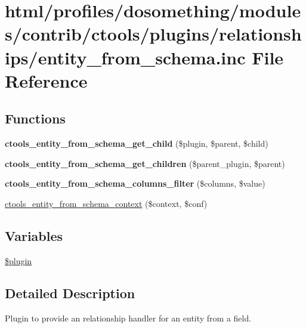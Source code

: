 \hypertarget{entity__from__schema_8inc}{
\section{html/profiles/dosomething/modules/contrib/ctools/plugins/relationships/entity\_\-from\_\-schema.inc File Reference}
\label{entity__from__schema_8inc}
}
\subsection*{Functions}
\begin{DoxyCompactItemize}
\item 
\hypertarget{entity__from__schema_8inc_ac19d1b35d03bdb7469c775bf7d32271b}{
{\bfseries ctools\_\-entity\_\-from\_\-schema\_\-get\_\-child} (\$plugin, \$parent, \$child)}
\label{entity__from__schema_8inc_ac19d1b35d03bdb7469c775bf7d32271b}

\item 
\hypertarget{entity__from__schema_8inc_a002177eb023c2ab3b998f7cc59daa7a2}{
{\bfseries ctools\_\-entity\_\-from\_\-schema\_\-get\_\-children} (\$parent\_\-plugin, \$parent)}
\label{entity__from__schema_8inc_a002177eb023c2ab3b998f7cc59daa7a2}

\item 
\hypertarget{entity__from__schema_8inc_afdc8c663207a4c4e62cccf9b07f98728}{
{\bfseries ctools\_\-entity\_\-from\_\-schema\_\-columns\_\-filter} (\$columns, \$value)}
\label{entity__from__schema_8inc_afdc8c663207a4c4e62cccf9b07f98728}

\item 
\hyperlink{entity__from__schema_8inc_a04ba5637f53804c2f3441f5728ad5713}{ctools\_\-entity\_\-from\_\-schema\_\-context} (\$context, \$conf)
\end{DoxyCompactItemize}
\subsection*{Variables}
\begin{DoxyCompactItemize}
\item 
\hyperlink{entity__from__schema_8inc_ada8a7130088351710bb02ed622d6bf65}{\$plugin}
\end{DoxyCompactItemize}


\subsection{Detailed Description}
Plugin to provide an relationship handler for an entity from a field. 

